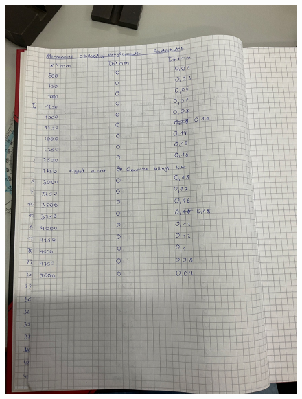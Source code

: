 \begin{figure}[h]
    \centering
    \includegraphics[width=\textwidth]{content/KladdeS4.jpeg}
\end{figure}